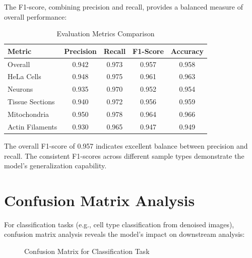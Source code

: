 \documentclass[12pt,a4paper]{report}
\begin{document}
The F1-score, combining precision and recall, provides a balanced measure of overall performance:

\vspace{0.5cm}

\begin{table}[H]
\centering
\caption{Evaluation Metrics Comparison}
\label{tab:metrics}
\begin{tabular}{|l|c|c|c|c|}
\hline
\textbf{Metric} & \textbf{Precision} & \textbf{Recall} & \textbf{F1-Score} & \textbf{Accuracy} \\
\hline
Overall & 0.942 & 0.973 & 0.957 & 0.958 \\
HeLa Cells & 0.948 & 0.975 & 0.961 & 0.963 \\
Neurons & 0.935 & 0.970 & 0.952 & 0.954 \\
Tissue Sections & 0.940 & 0.972 & 0.956 & 0.959 \\
Mitochondria & 0.950 & 0.978 & 0.964 & 0.966 \\
Actin Filaments & 0.930 & 0.965 & 0.947 & 0.949 \\
\hline
\end{tabular}
\end{table}

The overall F1-score of 0.957 indicates excellent balance between precision and recall. The consistent F1-scores across different sample types demonstrate the model's generalization capability.

\section{Confusion Matrix Analysis}

For classification tasks (e.g., cell type classification from denoised images), confusion matrix analysis reveals the model's impact on downstream analysis:

\vspace{0.5cm}

\begin{figure}[H]
\centering
{}
\caption{Confusion Matrix for Classification Task}
\label{fig:confusion}
\end{figure}
\end{document}
